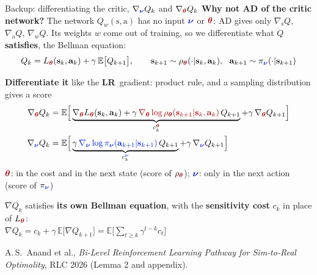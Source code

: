 \documentclass[lecture]{beamer}
\newcommand{\vect}[1]{\ensuremath{\boldsymbol{\mathrm{#1}}}}
\newcommand{\mth}{\textcolor{myRed2}{\vect\theta}}
\newcommand{\pnu}{\textcolor{myBlue3}{\vect\nu}}
\newcommand{\sv}{\vect s}
\newcommand{\av}{\vect a}
\newcommand{\Lth}{L_{\mth}}
\newcommand{\rth}{\rho_{\mth}}
\newcommand{\pin}{\pi_{\pnu}}
\newcommand{\E}{\mathbb E}
\newcommand{\LR}{\textcolor{myOrangeD}{\textbf{LR}}}
\begin{document}
\begin{frame}[noframenumbering]{\normalsize Backup: differentiating the critic, $\nabla_{\pnu}Q_k$ and $\nabla_{\mth}Q_k$}
\footnotesize
\textbf{Why not AD of the critic network?} The network $Q_w(\sv,\av)$ has no input $\pnu$ or $\mth$: AD gives only $\nabla_{\sv}Q$, $\nabla_{\av}Q$, $\nabla_wQ$. Its weights $w$ come out of training, so we differentiate what $Q$ \textbf{satisfies}, the Bellman equation:
\vspace{-.15cm}
\[Q_k=\Lth(\sv_k,\av_k)+\gamma\,\E\big[Q_{k+1}\big],\qquad \sv_{k+1}\sim\rth(\cdot|\sv_k,\av_k),\ \ \av_{k+1}\sim\pin(\cdot|\sv_{k+1})\]
\vspace{-.4cm}

\textbf{Differentiate it} like the \LR\ gradient: product rule, and a sampling distribution gives a score
\vspace{-.15cm}
\begin{align*}
\nabla_{\mth}Q_k&=\E\Big[\underbrace{\nabla_{\mth}\Lth(\sv_k,\av_k)+\gamma\,\textcolor{myRed2}{\nabla_{\mth}\log\rth(\sv_{k+1}|\sv_k,\av_k)}\,Q_{k+1}}_{c^{\mth}_k}+\gamma\,\nabla_{\mth}Q_{k+1}\Big]\\
\nabla_{\pnu}Q_k&=\E\Big[\underbrace{\gamma\,\textcolor{myBlue3}{\nabla_{\pnu}\log\pin(\av_{k+1}|\sv_{k+1})}\,Q_{k+1}}_{c^{\pnu}_k}+\gamma\,\nabla_{\pnu}Q_{k+1}\Big]
\end{align*}
{\scriptsize $\mth$: in the cost and in the next state (score of $\rth$); \quad $\pnu$: only in the next action (score of $\pin$)}
\vspace{.1cm}
\begin{alertblock}{}
\centering $\nabla Q_k$ satisfies \textbf{its own Bellman equation}, with the \textbf{sensitivity cost} $c_k$ in place of $\Lth$:\\[2pt]
$\nabla Q_k=c_k+\gamma\,\E\big[\nabla Q_{k+1}\big]=\E\big[\textstyle\sum_{t\ge k}\gamma^{t-k}c_t\big]$
\end{alertblock}
\vfill
\parbox{0.95\textwidth}{\tiny A.\,S.~Anand et al., \textit{Bi-Level Reinforcement Learning Pathway for Sim-to-Real Optimality}, RLC 2026 (Lemma 2 and appendix).}
\end{frame}
\end{document}
